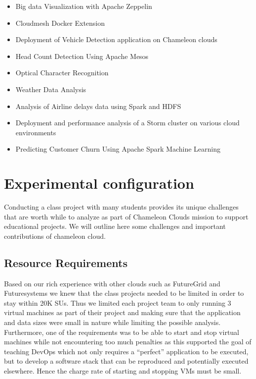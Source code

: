 \documentclass[sigconf]{acmart}
\begin{document}
\begin{itemize}
\item Big data Visualization with Apache Zeppelin

\item Cloudmesh Docker Extension

\item Deployment of Vehicle Detection application on Chameleon clouds

\item Head Count Detection Using Apache Mesos

\item Optical Character Recognition

\item Weather Data Analysis

\item Analysis of Airline delays data using Spark and HDFS

\item Deployment and performance analysis of a Storm cluster on various cloud environments 

\item Predicting Customer Churn Using Apache Spark Machine Learning 

\end{itemize}

\section{Experimental configuration}

Conducting a class project with many students provides its unique
challenges that are worth while to analyze as part of Chameleon Clouds
mission to support educational projects. We will outline here some
challenges and important contributions of chameleon cloud.

\subsection{Resource Requirements}

Based on our rich experience with other clouds such as FutureGrid
and Futuresystems we knew that the class projects needed to be limited
in order to stay within 20K SUs. Thus we limited each project team to
only running 3 virtual machines as part of their project and making
sure that the application and data sizes were small in nature while
limiting the possible analysis. Furthermore, one of the requirements
was to be able to start and stop virtual machines while not
encountering too much penalties as this supported the goal of teaching
DevOps which not only requires a ``perfect'' application to be executed,
but to develop a software stack that can be reproduced and potentially
executed elsewhere. Hence the charge rate of starting and stopping VMs
must be small.
\end{document}
